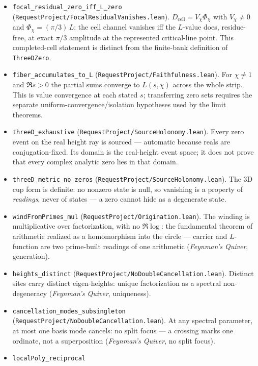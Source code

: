 \begin{itemize}
trace equals the explicit-formula sum of log-derivative residues: the trace
formulas coincide, not just the locations.
\item \texttt{focal\_residual\_zero\_iff\_L\_zero}
(\texttt{RequestProject/FocalResidualVanishes.lean}).
\(D_{\mathrm{cell}}=V_\chi\Phi_\chi\) with \(V_\chi\neq0\) and
\(\Phi_\chi=(\pi/3)\,L\): the cell channel vanishes iff the \(L\)-value
does, residue-free, at exact \(\pi/3\) amplitude at the represented
critical-line point.  This completed-cell statement is distinct from the
finite-bank definition of \texttt{ThreeDZero}.
\item \texttt{fiber\_accumulates\_to\_L}
(\texttt{RequestProject/Faithfulness.lean}). For \(\chi\neq1\) and
\(\Re s>0\) the partial sums converge to \(L(s,\chi)\) across the whole
strip.  This is value convergence at each stated \(s\); transferring zero
sets requires the separate uniform-convergence/isolation hypotheses used by
the limit theorems.
\item \texttt{threeD\_exhaustive}
(\texttt{RequestProject/SourceHolonomy.lean}). Every zero event on the real
height ray is sourced --- automatic because reals are conjugation-fixed.  Its
domain is the real-height event space; it does not prove that every complex
analytic zero lies in that domain.
\item \texttt{threeD\_metric\_no\_zeros}
(\texttt{RequestProject/SourceHolonomy.lean}). The 3D cup form is definite:
no nonzero state is null, so vanishing is a property of \emph{readings},
never of states --- a zero cannot hide as a degenerate state.
\item \texttt{windFromPrimes\_mul}
(\texttt{RequestProject/Origination.lean}). The winding is multiplicative
over factorization, with no \(\Re\!\log\): the fundamental theorem of
arithmetic realized as a homomorphism into the circle --- carrier and
\(L\)-function are two prime-built readings of one arithmetic (\emph{Feynman's Quiver},
generation).
\item \texttt{heights\_distinct}
(\texttt{RequestProject/NoDoubleCancellation.lean}). Distinct sites carry
distinct eigen-heights: unique factorization as a spectral
non-degeneracy (\emph{Feynman's Quiver}, uniqueness).
\item \texttt{cancellation\_modes\_subsingleton}
(\texttt{RequestProject/NoDoubleCancellation.lean}). At any spectral
parameter, at most one basis mode cancels: no split focus --- a crossing
marks one ordinate, not a superposition (\emph{Feynman's Quiver}, no split focus).
\item \texttt{localPoly\_reciprocal}

\end{itemize}

